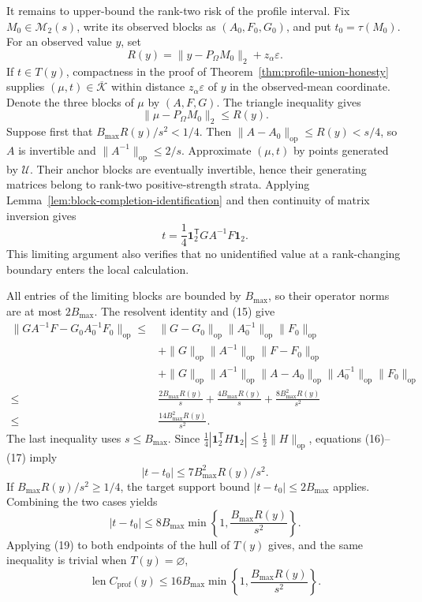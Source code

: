 It remains to upper-bound the rank-two risk of the profile interval.  Fix
\(M_0\in\mathcal M_2(s)\), write its observed blocks as
\((A_0,F_0,G_0)\), and put \(t_0=\tau(M_0)\).  For an observed value \(y\),
set
\[
 R(y)=\lVert y-P_\Omega M_0\rVert_2+z_\alpha\varepsilon.
\tag{14}
\]
If \(t\in T(y)\), compactness in the proof of
Theorem~\ref{thm:profile-union-honesty} supplies
\((\mu,t)\in\overline{\mathcal K}\) within distance
\(z_\alpha\varepsilon\) of \(y\) in the observed-mean coordinate.  Denote
the three blocks of \(\mu\) by \((A,F,G)\).  The triangle inequality gives
\[
 \lVert\mu-P_\Omega M_0\rVert_2\leq R(y).
\tag{15}
\]
Suppose first that \(B_{\max}R(y)/s^2<1/4\).  Then
\(\lVert A-A_0\rVert_{\mathrm{op}}\leq R(y)<s/4\), so \(A\) is
invertible and \(\lVert A^{-1}\rVert_{\mathrm{op}}\leq2/s\).
Approximate \((\mu,t)\) by points generated by \(\mathcal U\).  Their
anchor blocks are eventually invertible, hence their generating matrices
belong to rank-two positive-strength strata.  Applying
Lemma~\ref{lem:block-completion-identification} and then continuity of matrix
inversion gives
\[
 t=\frac14\mathbf1_2^{\mathsf T}GA^{-1}F\mathbf1_2.
\tag{16}
\]
This limiting argument also verifies that no unidentified value at a
rank-changing boundary enters the local calculation.

All entries of the limiting blocks are bounded by \(B_{\max}\), so their
operator norms are at most \(2B_{\max}\).  The resolvent identity and (15)
give
\[
\begin{split}
 \lVert GA^{-1}F-G_0A_0^{-1}F_0\rVert_{\mathrm{op}}
 \leq{}&\lVert G-G_0\rVert_{\mathrm{op}}
          \lVert A_0^{-1}\rVert_{\mathrm{op}}
          \lVert F_0\rVert_{\mathrm{op}}\\
 &+\lVert G\rVert_{\mathrm{op}}
    \lVert A^{-1}\rVert_{\mathrm{op}}
    \lVert F-F_0\rVert_{\mathrm{op}}\\
 &+\lVert G\rVert_{\mathrm{op}}
    \lVert A^{-1}\rVert_{\mathrm{op}}
    \lVert A-A_0\rVert_{\mathrm{op}}
    \lVert A_0^{-1}\rVert_{\mathrm{op}}
    \lVert F_0\rVert_{\mathrm{op}}\\
 \leq{}&\frac{2B_{\max}R(y)}s+
          \frac{4B_{\max}R(y)}s+
          \frac{8B_{\max}^2R(y)}{s^2}\\
 \leq{}&\frac{14B_{\max}^2R(y)}{s^2}.
\end{split}
\tag{17}
\]
The last inequality uses \(s\leq B_{\max}\).  Since
\(\tfrac14|\mathbf1_2^{\mathsf T}H\mathbf1_2|
\leq\tfrac12\lVert H\rVert_{\mathrm{op}}\), equations (16)--(17) imply
\[
 |t-t_0|\leq7B_{\max}^2R(y)/s^2.
\tag{18}
\]
If \(B_{\max}R(y)/s^2\geq1/4\), the target support bound
\(|t-t_0|\leq2B_{\max}\) applies.  Combining the two cases yields
\[
 |t-t_0|\leq8B_{\max}
 \min\left\{1,\frac{B_{\max}R(y)}{s^2}\right\}.
\tag{19}
\]
Applying (19) to both endpoints of the hull of \(T(y)\) gives, and the same
inequality is trivial when \(T(y)=\varnothing\),
\[
 \operatorname{len}C_{\mathrm{prof}}(y)
 \leq16B_{\max}
 \min\left\{1,\frac{B_{\max}R(y)}{s^2}\right\}.
\tag{20}
\]

